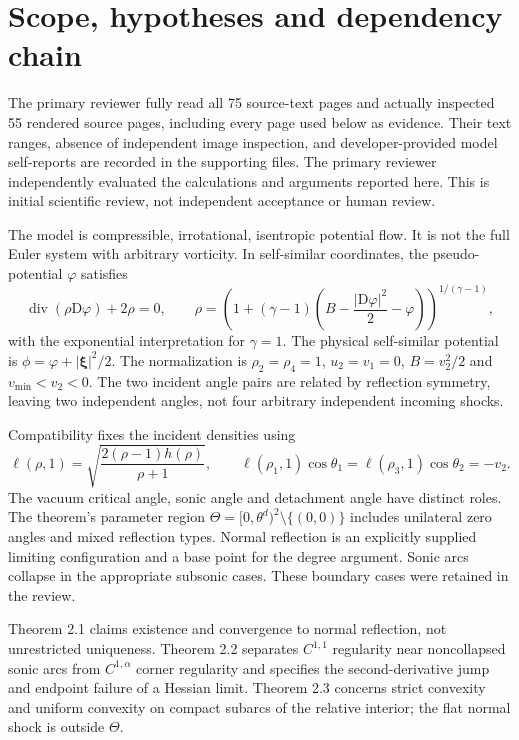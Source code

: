 \documentclass[10pt]{article}
\begin{document}
\section*{Scope, hypotheses and dependency chain}
The primary reviewer fully read all 75 source-text pages and actually inspected 55 rendered source pages, including every page used below as evidence. Their text ranges, absence of independent image inspection, and developer-provided model self-reports are recorded in the supporting files. The primary reviewer independently evaluated the calculations and arguments reported here. This is initial scientific review, not independent acceptance or human review.\par
The model is compressible, irrotational, isentropic potential flow. It is not the full Euler system with arbitrary vorticity. In self-similar coordinates, the pseudo-potential \(\varphi\) satisfies \[\operatorname{div}(\rho\mathrm D\varphi)+2\rho=0,\qquad
 \rho=\left(1+(\gamma-1)
       \left(B-\frac{|\mathrm D\varphi|^2}{2}-\varphi\right)\right)^{1/(\gamma-1)},\] with the exponential interpretation for \(\gamma=1\). The physical self-similar potential is \(\phi=\varphi+|\boldsymbol\xi|^2/2\). The normalization is \(\rho_2=\rho_4=1\), \(u_2=v_1=0\), \(B=v_2^2/2\) and \(v_{\min}<v_2<0\). The two incident angle pairs are related by reflection symmetry, leaving two independent angles, not four arbitrary independent incoming shocks.\par
Compatibility fixes the incident densities using \[\ell(\rho,1)=\sqrt{\frac{2(\rho-1)h(\rho)}{\rho+1}},
 \qquad
 \ell(\rho_1,1)\cos\theta_1
 =\ell(\rho_3,1)\cos\theta_2=-v_2.\] The vacuum critical angle, sonic angle and detachment angle have distinct roles. The theorem’s parameter region \(\Theta=[0,\theta^d)^2\setminus\{(0,0)\}\) includes unilateral zero angles and mixed reflection types. Normal reflection is an explicitly supplied limiting configuration and a base point for the degree argument. Sonic arcs collapse in the appropriate subsonic cases. These boundary cases were retained in the review.\par
Theorem 2.1 claims existence and convergence to normal reflection, not unrestricted uniqueness. Theorem 2.2 separates \(C^{1,1}\) regularity near noncollapsed sonic arcs from \(C^{1,\alpha}\) corner regularity and specifies the second-derivative jump and endpoint failure of a Hessian limit. Theorem 2.3 concerns strict convexity and uniform convexity on compact subarcs of the relative interior; the flat normal shock is outside \(\Theta\).\par
\end{document}
